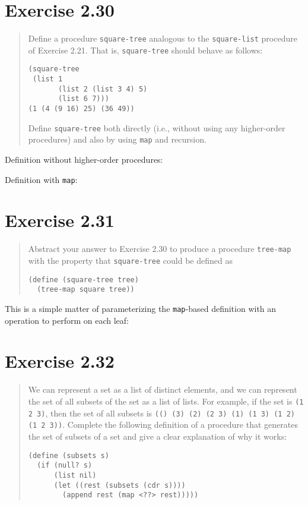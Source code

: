\documentclass{article}
\begin{document}
\section{Exercise 2.30}
\begin{quote}
    Define a procedure \texttt{square-tree} analogous to the
    \texttt{square-list} procedure of Exercise 2.21. That is,
    \texttt{square-tree} should behave as follows:
    \begin{lstlisting}
(square-tree
 (list 1
       (list 2 (list 3 4) 5)
       (list 6 7)))
(1 (4 (9 16) 25) (36 49))
    \end{lstlisting}
    Define \texttt{square-tree} both directly (i.e., without using any
    higher-order procedures) and also by using \texttt{map} and recursion.
\end{quote}

Definition without higher-order procedures:


Definition with \texttt{map}:


\section{Exercise 2.31}
\begin{quote}
    Abstract your answer to Exercise 2.30 to produce a procedure
    \texttt{tree-map} with the property that \texttt{square-tree} could be
    defined as
    \begin{lstlisting}
(define (square-tree tree)
  (tree-map square tree))
    \end{lstlisting}
\end{quote}

This is a simple matter of parameterizing the \texttt{map}-based definition
with an operation to perform on each leaf:


\section{Exercise 2.32}
\begin{quote}
    We can represent a set as a list of distinct elements, and we can represent
    the set of all subsets of the set as a list of lists. For example, if the
    set is \texttt{(1 2 3)}, then the set of all subsets is \texttt{(() (3) (2)
    (2 3) (1) (1 3) (1 2) (1 2 3))}. Complete the following definition of a
    procedure that generates the set of subsets of a set and give a clear
    explanation of why it works:
    \begin{lstlisting}
(define (subsets s)
  (if (null? s)
      (list nil)
      (let ((rest (subsets (cdr s))))
        (append rest (map <??> rest)))))
    \end{lstlisting}
\end{quote}
\end{document}
